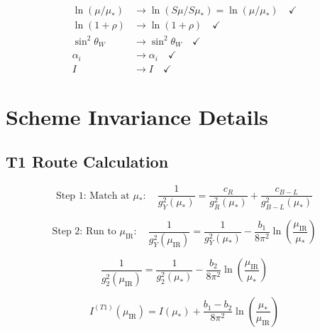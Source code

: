 \documentclass[11pt,a4paper]{article}
\theoremstyle{definition}
\begin{document}
\begin{align}
\label{eq:S_ver_6}
\ln(\mu/\mu_*) &\to \ln(S\mu/S\mu_*) = \ln(\mu/\mu_*) \quad \checkmark \\
\label{eq:S_ver_7}
\ln(1 + \rho) &\to \ln(1 + \rho) \quad \checkmark \\
\label{eq:S_ver_8}
\sin^2\theta_W &\to \sin^2\theta_W \quad \checkmark \\
\label{eq:S_ver_9}
\alpha_i &\to \alpha_i \quad \checkmark \\
\label{eq:S_ver_10}
I &\to I \quad \checkmark
\end{align}

\section{Scheme Invariance Details}
\label{app:scheme}

\subsection{T1 Route Calculation}
\label{subsec:T1_detail}

\begin{equation}
\label{eq:T1_step1}
\text{Step 1: Match at } \mu_*: \quad \frac{1}{g_Y^2(\mu_*)} = \frac{c_R}{g_R^2(\mu_*)} + \frac{c_{B-L}}{g_{B-L}^2(\mu_*)}
\end{equation}

\begin{equation}
\label{eq:T1_step2}
\text{Step 2: Run to } \mu_{\text{IR}}: \quad \frac{1}{g_Y^2(\mu_{\text{IR}})} = \frac{1}{g_Y^2(\mu_*)} - \frac{b_1}{8\pi^2}\ln\left(\frac{\mu_{\text{IR}}}{\mu_*}\right)
\end{equation}

\begin{equation}
\label{eq:T1_step3}
\frac{1}{g_2^2(\mu_{\text{IR}})} = \frac{1}{g_2^2(\mu_*)} - \frac{b_2}{8\pi^2}\ln\left(\frac{\mu_{\text{IR}}}{\mu_*}\right)
\end{equation}

\begin{equation}
\label{eq:T1_result}
I^{(T1)}(\mu_{\text{IR}}) = I(\mu_*) + \frac{b_1 - b_2}{8\pi^2}\ln\left(\frac{\mu_*}{\mu_{\text{IR}}}\right)
\end{equation}
\end{document}
